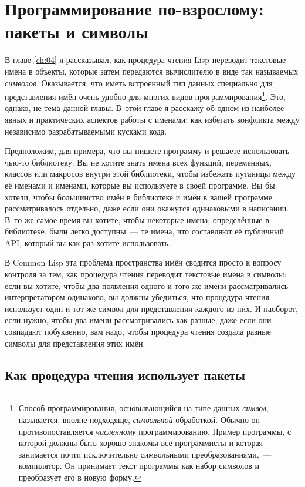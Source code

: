 \chapter{Программирование по-взрослому: пакеты и символы}
\label{ch:21}

\thispagestyle{empty}

В главе \ref{ch:04} я рассказывал, как процедура чтения Lisp переводит текстовые имена в
объекты, которые затем передаются вычислителю в виде так называемых \textit{символов}.
Оказывается, что иметь встроенный тип данных специально для представления имён очень
удобно для многих видов программирования\footnote{Способ программирования, основывающийся
  на типе данных \textit{символ}, называется, вполне подходяще, \textit{символьной}
  обработкой. Обычно он противопоставляется \textit{численному} программированию.  Пример
  программы, с которой должны быть хорошо знакомы все программисты и которая занимается
  почти исключительно символьными преобразованиями,~--- компилятор. Он принимает текст
  программы как набор символов и преобразует его в новую форму.}. Это, однако, не тема
данной главы. В~этой главе я расскажу об одном из наиболее явных и практических аспектов
работы с именами: как избегать конфликта между независимо разрабатываемыми кусками кода.

Предположим, для примера, что вы пишете программу и решаете использовать чью-то
библиотеку.  Вы не хотите знать имена всех функций, переменных, классов или макросов
внутри этой библиотеки, чтобы избежать путаницы между её именами и именами, которые вы
используете в своей программе. Вы бы хотели, чтобы большинство имён в библиотеке и имён в
вашей программе рассматривалось отдельно, даже если они окажутся одинаковыми в написании.
В~то же самое время вы хотите, чтобы некоторые имена, определённые в библиотеке, были
легко доступны~--- те имена, что составляют её публичный API, который вы как раз хотите
использовать.

В Common Lisp эта проблема пространства имён сводится просто к вопросу конт\-ро\-ля за тем,
как процедура чтения переводит текстовые имена в символы: если вы хотите, чтобы два появления
одного и того же имени рассматривались интерпретатором одинаково, вы должны убедиться, что
процедура чтения использует один и тот же символ для представления каждого из них. И наоборот,
если нужно, чтобы два имени рассматривались как разные, даже если они совпадают
побуквенно, вам надо, чтобы процедура чтения создала разные символы для представления этих имён.

\section{Как процедура чтения использует пакеты}


